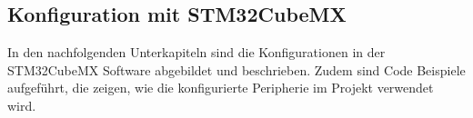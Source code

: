 \subsection{Konfiguration mit STM32CubeMX}
\label{sec:CubeMX}

In den nachfolgenden Unterkapiteln sind die Konfigurationen in der STM32CubeMX Software abgebildet und beschrieben. Zudem sind Code Beispiele aufgeführt, die zeigen, wie die konfigurierte Peripherie im Projekt verwendet wird.

